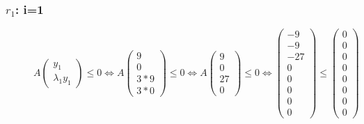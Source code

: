 	\subsubsection{$r_1$: i=1}
	\begin{figure}[H]
		\centering
		$A\begin{pmatrix} y_1 \\ \lambda_1y_1 \end{pmatrix} \le 0 \Leftrightarrow A\begin{pmatrix} 9 \\ 0 \\ 3*9 \\ 3*0 \end{pmatrix} \le 0 \Leftrightarrow A\begin{pmatrix} 9 \\ 0 \\ 27 \\ 0 \end{pmatrix} \le 0 \Leftrightarrow \begin{pmatrix} -9 \\ -9 \\ -27 \\ 0 \\ 0 \\ 0 \\ 0 \\ 0 \end{pmatrix} \le \begin{pmatrix} 0 \\ 0 \\ 0 \\ 0 \\ 0 \\ 0 \\ 0 \\ 0 \end{pmatrix}$
	\end{figure}
	
